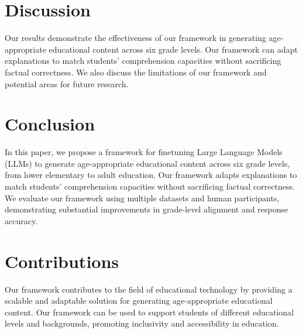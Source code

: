 \documentclass{article}
\begin{document}
\section{Discussion}
Our results demonstrate the effectiveness of our framework in generating age-appropriate educational content across six grade levels. Our framework can adapt explanations to match students' comprehension capacities without sacrificing factual correctness. We also discuss the limitations of our framework and potential areas for future research.

\section{Conclusion}
In this paper, we propose a framework for finetuning Large Language Models (LLMs) to generate age-appropriate educational content across six grade levels, from lower elementary to adult education. Our framework adapts explanations to match students' comprehension capacities without sacrificing factual correctness. We evaluate our framework using multiple datasets and human participants, demonstrating substantial improvements in grade-level alignment and response accuracy.

\section{Contributions}
Our framework contributes to the field of educational technology by providing a scalable and adaptable solution for generating age-appropriate educational content. Our framework can be used to support students of different educational levels and backgrounds, promoting inclusivity and accessibility in education.
\end{document}
